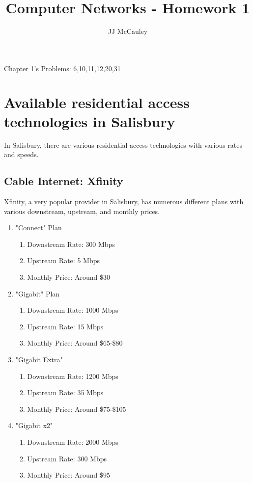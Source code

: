 \documentclass{article}
\title{Computer Networks - Homework 1}
\author{JJ McCauley}
\begin{document}
\maketitle

Chapter 1's Problems: 6,10,11,12,20,31

\setcounter{section}{5}
\section{Available residential access technologies in Salisbury}

In Salisbury, there are various residential access technologies with various rates and speeds.

\subsection{Cable Internet: Xfinity}

Xfinity, a very popular provider in Salisbury, has numerous different plans with various downstream, upstream, and monthly prices.
\begin{enumerate}
    \item "Connect" Plan \begin{enumerate}
        \item Downstream Rate: 300 Mbps
        \item Upstream Rate: 5 Mbps
        \item Monthly Price: Around \$30
    \end{enumerate}
    \item "Gigabit" Plan \begin{enumerate}
        \item Downstream Rate: 1000 Mbps
        \item Upstream Rate: 15 Mbps
        \item Monthly Price: Around \$65-\$80 
    \end{enumerate}
    \item "Gigabit Extra" \begin{enumerate}
        \item Downstream Rate: 1200 Mbps
        \item Upstream Rate: 35 Mbps
        \item Monthly Price: Around \$75-\$105
    \end{enumerate}
    \item "Gigabit x2" \begin{enumerate}
        \item Downstream Rate: 2000 Mbps
        \item Upstream Rate: 300 Mbps
        \item Monthly Price: Around \$95
    \end{enumerate}
\end{enumerate}
\end{document}
